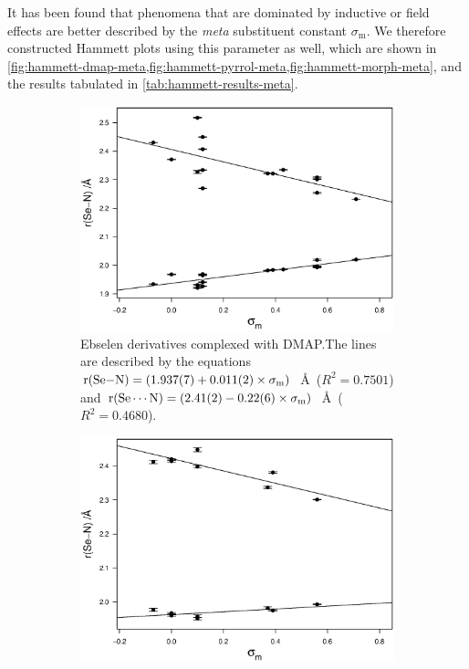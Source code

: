 \begin{refsection}
It has been found that phenomena that are dominated by inductive or field effects are better described by the \textit{meta} substituent constant $\sigma_\text{m}$.\autocite{Reynolds1980,Sarwar2010}
We therefore constructed Hammett plots using this parameter as well, which are shown in \cref{fig:hammett-dmap-meta,fig:hammett-pyrrol-meta,fig:hammett-morph-meta}, and the results tabulated in \cref{tab:hammett-results-meta}.

\begin{figure}
  \centering
\begin{subfigure}[t]{0.45\linewidth}
  \centering
  \includegraphics[width=\linewidth]{Figures/hammett-dmap-m.eps}
  \caption{Ebselen derivatives complexed with DMAP.\@ The lines are described by the equations $\mathrm{r}(\ce{Se-N}) = (1.937(7) + 0.011(2) \times \sigma_\text{m})$~\AA~($R^2=0.7501$) and $\mathrm{r}(\ce{Se\cdots N}) = (2.41(2) - 0.22(6) \times \sigma_\text{m})$~\AA~($R^2=0.4680$).}\label{fig:hammett-dmap-meta}
\end{subfigure}
\hfill
\begin{subfigure}[t]{0.45\linewidth}
\centering
\includegraphics[width=\linewidth]{Figures/hammett-morph-m.eps}

\end{subfigure}
\end{figure}
\end{refsection}
